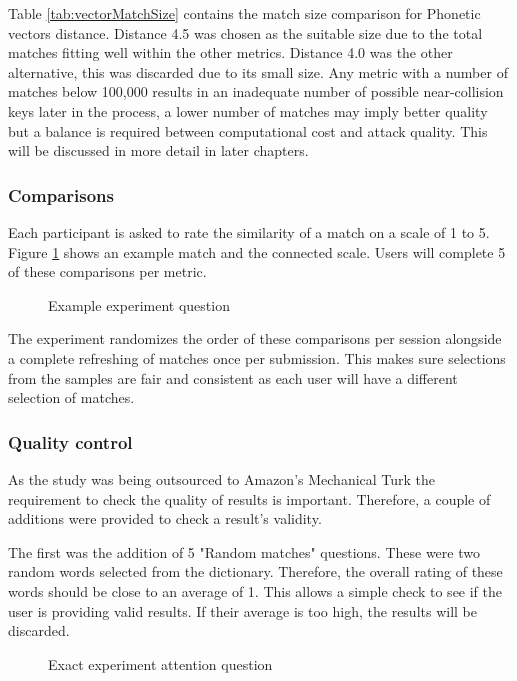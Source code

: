 Table \ref{tab:vectorMatchSize} contains the match size comparison for Phonetic vectors distance. Distance 4.5 was chosen as the suitable size due to the total matches fitting well within the other metrics. Distance 4.0 was the other alternative, this was discarded due to its small size. Any metric with a number of matches below 100,000 results in an inadequate number of possible near-collision keys later in the process, a lower number of matches may imply better quality but a balance is required between computational cost and attack quality. This will be discussed in more detail in later chapters.

\newpage

\subsubsection{Comparisons}
Each participant is asked to rate the similarity of a match on a scale of 1 to 5. Figure \ref{fig:phoneticMatch} shows an example match and the connected scale. Users will complete 5 of these comparisons per metric.

\begin{figure}[h!]
    \centering
    \caption{Example experiment question}
    \label{fig:phoneticMatch}
\end{figure}

The experiment randomizes the order of these comparisons per session alongside a complete refreshing of matches once per submission. This makes sure selections from the samples are fair and consistent as each user will have a different selection of matches.

\subsubsection{Quality control}
As the study was being outsourced to Amazon's Mechanical Turk the requirement to check the quality of results is important. Therefore, a couple of additions were provided to check a result's validity.

The first was the addition of 5 "Random matches" questions. These were two random words selected from the dictionary. Therefore, the overall rating of these words should be close to an average of 1. This allows a simple check to see if the user is providing valid results. If their average is too high, the results will be discarded.

\begin{figure}[h!]
    \centering
    \caption{Exact experiment attention question}
    \label{fig:exactMatch}
\end{figure}

